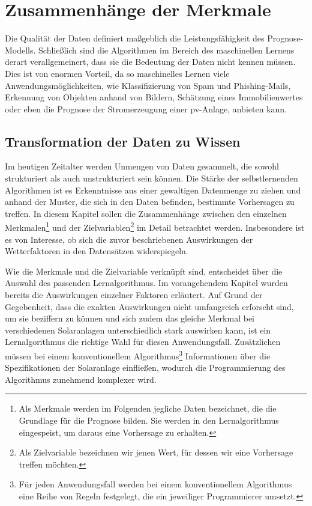 \documentclass[12pt, a4paper]{article}
\begin{document}
\newpage

\section{Zusammenhänge der Merkmale}
\label{sec:features}

Die Qualität der Daten definiert maßgeblich die Leistungsfähigkeit des Prognose-Modells. Schließlich sind die Algorithmen im Bereich des maschinellen Lernens derart verallgemeinert, dass sie die Bedeutung der Daten nicht kennen müssen. Dies ist von enormen Vorteil, da so maschinelles Lernen viele Anwendungsmöglichkeiten, wie Klassifizierung von Spam und Phishing-Mails, Erkennung von Objekten anhand von Bildern, Schätzung eines Immobilienwertes oder eben die Prognose der Stromerzeugung einer \ac{pv}-Anlage, anbieten kann.

\subsection{Transformation der Daten zu Wissen}

Im heutigen Zeitalter werden Unmengen von Daten gesammelt, die sowohl strukturiert als auch unstrukturiert sein können. Die Stärke der selbstlernenden Algorithmen ist es Erkenntnisse aus einer gewaltigen Datenmenge zu ziehen und anhand der Muster, die sich in den Daten befinden, bestimmte Vorhersagen zu treffen. In diesem Kapitel sollen die Zusammenhänge zwischen den einzelnen Merkmalen\footnote{Als Merkmale werden im Folgenden jegliche Daten bezeichnet, die die Grundlage für die Prognose bilden. Sie werden in den Lernalgorithmus eingespeist, um daraus eine Vorhersage zu erhalten.} und der Zielvariablen\footnote{Als Zielvariable bezeichnen wir jenen Wert, für dessen wir eine Vorhersage treffen möchten.} im Detail betrachtet werden. Insbesondere ist es von Interesse, ob sich die zuvor beschriebenen Auswirkungen der Wetterfaktoren in den Datensätzen widerspiegeln.

Wie die Merkmale und die Zielvariable verknüpft sind, entscheidet über die Auswahl des passenden Lernalgorithmus. Im vorangehendem Kapitel wurden bereits die Auswirkungen einzelner Faktoren erläutert. Auf Grund der Gegebenheit, dass die exakten Auswirkungen nicht umfangreich erforscht sind, um sie beziffern zu können und sich zudem das gleiche Merkmal bei verschiedenen Solaranlagen unterschiedlich stark auswirken kann, ist ein Lernalgorithmus die richtige Wahl für diesen Anwendungsfall. Zusätzlichen müssen bei einem konventionellem Algorithmus\footnote{Für jeden Anwendungsfall werden bei einem konventionellem Algorithmus eine Reihe von Regeln festgelegt, die ein jeweiliger Programmierer umsetzt.} Informationen über die Spezifikationen der Solaranlage einfließen, wodurch die Programmierung des Algorithmus zunehmend komplexer wird.
\end{document}
